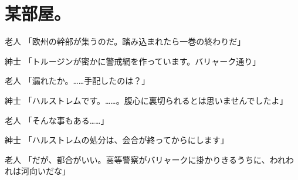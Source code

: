 \section*{某部屋。}

老人	「欧州の幹部が集うのだ。踏み込まれたら一巻の終わりだ」

紳士	「トルージンが密かに警戒網を作っています。バリャーク通り」

老人	「漏れたか。……手配したのは？」

紳士	「ハルストレムです。……。腹心に裏切られるとは思いませんでしたよ」

老人	「そんな事もある……」

紳士	「ハルストレムの処分は、会合が終ってからにします」

老人	「だが、都合がいい。高等警察がバリャークに掛かりきるうちに、われわれは河向いだな」
